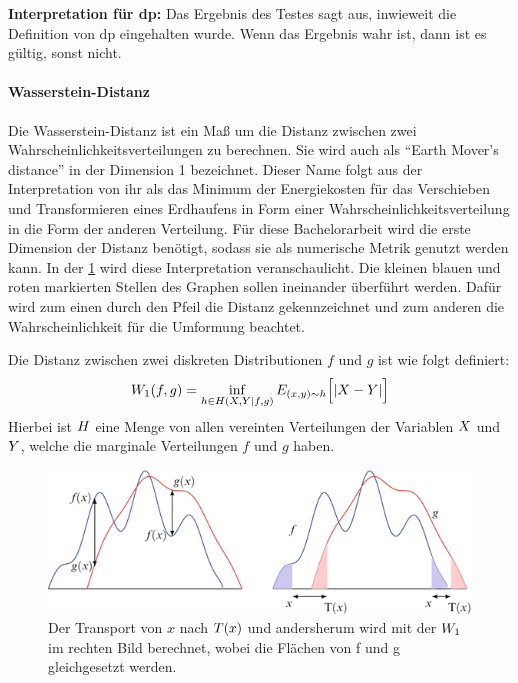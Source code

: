 \textbf{Interpretation für \gls{dp}: }
Das Ergebnis des Testes sagt aus, inwieweit die Definition von \gls{dp} eingehalten wurde. Wenn das Ergebnis wahr ist, dann ist es gültig, sonst nicht.
\paragraph{Wasserstein-Distanz}
Die Wasserstein-Distanz \parencite{WDExplanation} ist ein Maß um die Distanz zwischen zwei Wahrscheinlichkeitsverteilungen zu berechnen. Sie wird auch als \enquote{Earth Mover's distance} in der Dimension 1 bezeichnet. Dieser Name folgt aus der Interpretation von ihr als das Minimum der Energiekosten für das Verschieben und Transformieren eines Erdhaufens in Form einer Wahrscheinlichkeitsverteilung in die Form der anderen Verteilung. Für diese Bachelorarbeit wird die erste Dimension der Distanz benötigt, sodass sie als numerische Metrik genutzt werden kann. In der \cref{fig:wd} wird diese Interpretation veranschaulicht. Die kleinen blauen und roten markierten Stellen des Graphen sollen ineinander überführt werden. Dafür wird zum einen durch den Pfeil die Distanz gekennzeichnet und zum anderen die Wahrscheinlichkeit für die Umformung beachtet.


Die Distanz zwischen zwei diskreten Distributionen $f$ und $g$ ist wie folgt definiert:
\begin{equation*}
	W_{1} (f,g) = \inf_{h \in H(X,Y|f,g)} E_{(x,y)\sim h} \Bigl[|X - Y|\Bigr]
\end{equation*}
Hierbei ist $H$ eine Menge von allen vereinten Verteilungen der Variablen $X$ und $Y$, welche die marginale Verteilungen $f$ und $g$ haben.
\begin{figure}[htbp]
	\centering
	\includegraphics[scale=0.4]{./images/wasserstein_distance.png}
	\caption{Der Transport von $x$ nach $T(x)$ und andersherum wird mit der $W_{1}$ im rechten Bild berechnet, wobei die Flächen von f und g gleichgesetzt werden. \parencite{Santambrogio2015}}
	\label{fig:wd}
\end{figure}

